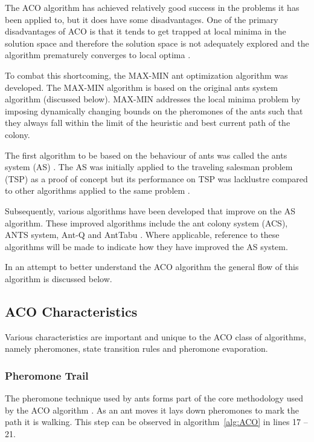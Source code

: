 The ACO algorithm has achieved relatively good success in the problems it has been applied to, but it does have some disadvantages\cite{ImpACOComplex,ACOSurvey}. One of the primary disadvantages of ACO is that it tends to get trapped at local minima in the solution space and therefore the solution space is not adequately explored and the algorithm prematurely converges to local optima \cite{ImpACOComplex}.

To combat this shortcoming, the MAX-MIN ant optimization algorithm was developed. The MAX-MIN algorithm is based on the original ants system algorithm (discussed below). MAX-MIN addresses the local minima problem by imposing dynamically changing bounds on the pheromones of the ants such that they always fall within the limit of the heuristic and best current path of the colony\cite{GangWangACO}.

The first algorithm to be based on the behaviour of ants was called the ants system (AS) \cite{CompuIntelligenceIntro,AntIntroTrends}. The AS was initially applied to the traveling salesman problem (TSP) as a proof of concept but its performance on TSP was lacklustre compared to other algorithms applied to the same problem \cite{CompuIntelligenceIntro,AntIntroTrends}. 

Subsequently, various algorithms have been developed that improve on the AS algorithm. These improved algorithms include the ant colony system (ACS), ANTS system, Ant-Q and AntTabu \cite{CompuIntelligenceIntro,AntIntroTrends}. Where applicable, reference to these algorithms will be made to indicate how they have improved the AS system.

In an attempt to better understand the ACO algorithm the general flow of this algorithm is discussed below.
\subsection{ACO Characteristics}
\label{sec:ACOcharacter}
Various characteristics are important and unique to the ACO class of algorithms, namely pheromones, state transition rules and pheromone evaporation.
\subsubsection{Pheromone Trail}
\label{sec:pheromonetrail}
The pheromone technique used by ants forms part of the core methodology used by the ACO algorithm \cite{AntQAP}. As an ant moves it lays down pheromones to mark the path it is walking. This step can be observed in algorithm~\ref{alg:ACO} in lines 17 -- 21.

